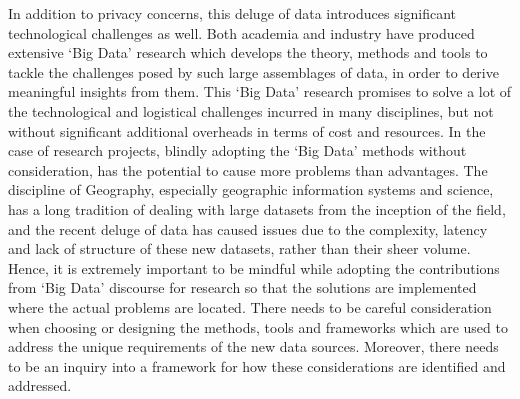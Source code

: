 In addition to privacy concerns, this deluge of data introduces significant technological challenges as well. 
Both academia and industry have produced extensive `Big Data' research which develops the theory, methods and tools to tackle the challenges posed by such large assemblages of data, in order to derive meaningful insights from them.
This `Big Data' research promises to solve a lot of the technological and logistical challenges incurred in many disciplines, but not without significant additional overheads in terms of cost and resources.
In the case of research projects, blindly adopting the `Big Data' methods without consideration, has the potential to cause more problems than advantages.
The discipline of Geography, especially geographic information systems and science, has a long tradition of dealing with large datasets from the inception of the field, and the recent deluge of data has caused issues due to the complexity, latency and lack of structure of these new datasets, rather than their sheer volume.
Hence, it is extremely important to be mindful while adopting the contributions from `Big Data' discourse for research so that the solutions are implemented where the actual problems are located.
There needs to be careful consideration when choosing or designing the methods, tools and frameworks which are used to address the unique requirements of the new data sources.
Moreover, there needs to be an inquiry into a framework for how these considerations are identified and addressed.

